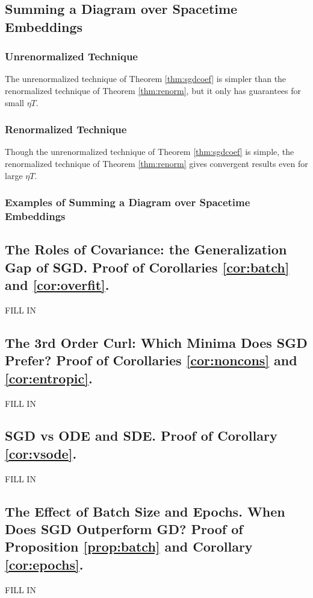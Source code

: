 \documentclass{article}
\theoremstyle{plain}
\theoremstyle{definition}
\begin{document}
    \subsection{Summing a Diagram over Spacetime Embeddings}
        \subsubsection*{Unrenormalized Technique} 
            The unrenormalized technique of Theorem \ref{thm:sgdcoef} is
            simpler than the renormalized technique of Theorem
            \ref{thm:renorm}, but it only has guarantees for small $\eta T$.
        \subsubsection*{Renormalized Technique} 
            Though the unrenormalized technique of Theorem \ref{thm:sgdcoef} is
            simple, the renormalized technique of Theorem \ref{thm:renorm}
            gives convergent results even for large $\eta T$.
        \subsubsection*{Examples of Summing a Diagram over Spacetime Embeddings}

    \subsection{
        The Roles of Covariance: the Generalization Gap of SGD.
        Proof of Corollaries \ref{cor:batch} and \ref{cor:overfit}. 
    }
        {\color{moor} FILL IN}
 
    \subsection{
        The 3rd Order Curl: Which Minima Does SGD Prefer?
        Proof of Corollaries \ref{cor:noncons} and \ref{cor:entropic}. 
    }
        {\color{moor} FILL IN}

    \subsection{
        SGD vs ODE and SDE.
        Proof of Corollary \ref{cor:vsode}. 
    }
        {\color{moor} FILL IN}

    \subsection{
        The Effect of Batch Size and Epochs.
        When Does SGD Outperform GD?
        Proof of Proposition \ref{prop:batch} and Corollary \ref{cor:epochs}. 
    }
        {\color{moor} FILL IN}
\end{document}
